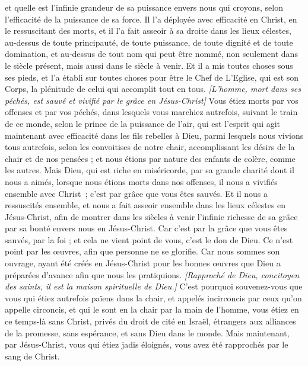 \begin{multicols}{2}
et quelle est l’infinie grandeur de sa puissance envers nous qui croyons, selon l’efficacité de la puissance de sa force.
Il l’a déployée avec efficacité en Christ, en le ressuscitant des morts, et il l’a fait asseoir à sa droite dans les lieux célestes,
au-dessus de toute principauté, de toute puissance, de toute dignité et de toute domination, et au-dessus de tout nom qui peut être nommé, non seulement dans le siècle présent, mais aussi dans le siècle à venir.
Et il a mis toutes choses sous ses pieds, et l'a établi sur toutes choses pour être le Chef de L’Eglise,
qui est son Corps, la plénitude de celui qui accomplit tout en tous.
\textit{[L'homme, mort dans ses péchés, est sauvé et vivifié par le grâce en Jésus-Christ]}
\VerseOne{}Vous étiez morts par vos offenses et par vos péchés,
dans lesquels vous marchiez autrefois, suivant le train de ce monde, selon le prince de la puissance de l'air, qui est l'esprit qui agit maintenant avec efficacité dans les fils rebelles à Dieu,
parmi lesquels nous vivions tous autrefois, selon les convoitises de notre chair, accomplissant les désirs de la chair et de nos pensées ; et nous étions par nature des enfants de colère, comme les autres.
Mais Dieu, qui est riche en miséricorde, par sa grande charité dont il nous a aimés,
lorsque nous étions morts dans nos offenses, il nous a vivifiés ensemble avec Christ ; c’est par grâce que vous êtes sauvés.
Et il nous a ressuscités ensemble, et nous a fait asseoir ensemble dans les lieux célestes en Jésus-Christ,
afin de montrer dans les siècles à venir l’infinie richesse de sa grâce par sa bonté envers nous en Jésus-Christ.
Car c’est par la grâce que vous êtes sauvés, par la foi ; et cela ne vient point de vous, c'est le don de Dieu.
Ce n’est point par les œuvres, afin que personne ne se glorifie.
Car nous sommes son ouvrage, ayant été créés en Jésus-Christ pour les bonnes œuvres que Dieu a préparées d’avance afin que nous les pratiquions.
\textit{[Rapproché de Dieu, concitoyen des saints, il est la maison spirituelle de Dieu.]}
C'est pourquoi souvenez-vous que vous qui étiez autrefois païens dans la chair, et appelés incirconcis par ceux qu’on appelle circoncis, et qui le sont en la chair par la main de l’homme,
vous étiez en ce temps-là sans Christ, privés du droit de cité en Israël, étrangers aux alliances de la promesse, sans espérance, et sans Dieu dans le monde.
Mais maintenant, par Jésus-Christ, vous qui étiez jadis éloignés, vous avez été rapprochés par le sang de Christ.

\end{multicols}
